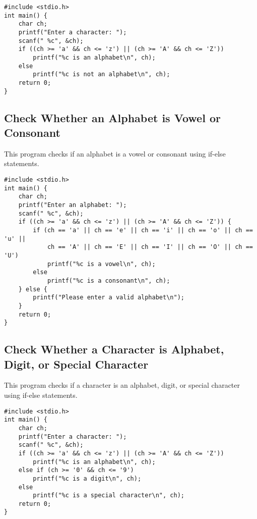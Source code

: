 \documentclass[a4paper,12pt]{article}
\begin{document}
\begin{lstlisting}[caption={Check Whether a Character is an Alphabet or Not}]
#include <stdio.h>
int main() {
    char ch;
    printf("Enter a character: ");
    scanf(" %c", &ch);
    if ((ch >= 'a' && ch <= 'z') || (ch >= 'A' && ch <= 'Z'))
        printf("%c is an alphabet\n", ch);
    else
        printf("%c is not an alphabet\n", ch);
    return 0;
}
\end{lstlisting}

\newpage

\subsection{Check Whether an Alphabet is Vowel or Consonant}
This program checks if an alphabet is a vowel or consonant using if-else statements.

\begin{lstlisting}[caption={Check Whether an Alphabet is Vowel or Consonant}]
#include <stdio.h>
int main() {
    char ch;
    printf("Enter an alphabet: ");
    scanf(" %c", &ch);
    if ((ch >= 'a' && ch <= 'z') || (ch >= 'A' && ch <= 'Z')) {
        if (ch == 'a' || ch == 'e' || ch == 'i' || ch == 'o' || ch == 'u' ||
            ch == 'A' || ch == 'E' || ch == 'I' || ch == 'O' || ch == 'U')
            printf("%c is a vowel\n", ch);
        else
            printf("%c is a consonant\n", ch);
    } else {
        printf("Please enter a valid alphabet\n");
    }
    return 0;
}
\end{lstlisting}

\newpage

\subsection{Check Whether a Character is Alphabet, Digit, or Special Character}
This program checks if a character is an alphabet, digit, or special character using if-else statements.

\begin{lstlisting}[caption={Check Whether a Character is Alphabet, Digit, or Special Character}]
#include <stdio.h>
int main() {
    char ch;
    printf("Enter a character: ");
    scanf(" %c", &ch);
    if ((ch >= 'a' && ch <= 'z') || (ch >= 'A' && ch <= 'Z'))
        printf("%c is an alphabet\n", ch);
    else if (ch >= '0' && ch <= '9')
        printf("%c is a digit\n", ch);
    else
        printf("%c is a special character\n", ch);
    return 0;
}
\end{lstlisting}
\end{document}
